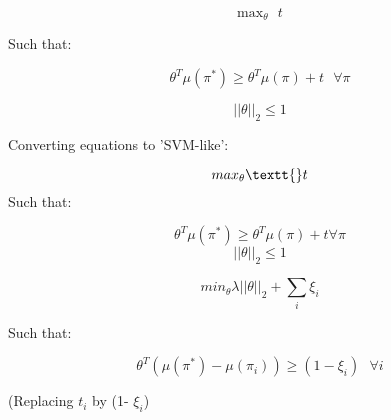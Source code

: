 \documentclass[11pt]{article}
\begin{document}
\begin{equation}
\text{max}_\theta\texttt{ }t
\end{equation}

Such that:

\begin{equation}
\theta^T\mu(\pi^*)\geq \theta^T\mu(\pi)+t \texttt{ } \forall \pi
\end{equation}

\begin{equation}
||\theta||_2 \leq 1
\end{equation}

Converting equations to 'SVM-like':

\begin{equation}
max_\theta \textt{ }t
\end{equation}
Such that:

\begin{equation}
\theta^T\mu(\pi^*)\geq \theta^T\mu(\pi)+t  \forall \pi
\end{equation}
\begin{equation}
||\theta||_2 \leq 1
\end{equation}

\begin{equation}
min_\theta \lambda||\theta||_2 + \sum_i \xi_i
\end{equation}

Such that:

\begin{equation}
\theta^T(\mu (\pi^*)-\mu(\pi_i))\geq (1-\xi_i) \texttt{ } \forall i 
\end{equation}


(Replacing $t_i$ by (1- $\xi_i$)
\end{document}
